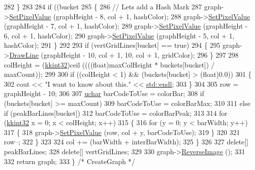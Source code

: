 \begin{DoxyCode}
282     \}
283 
284     \textcolor{keywordflow}{if}  ((bucket %
285     \{
286       \textcolor{comment}{// Lets add a Hash Mark}
287       graph->\hyperlink{class_k_k_b_1_1_raster_a5ddb8bd069dc64241941b0b011af8667}{SetPixelValue} (graphHeight - 8, col + 1, hashColor);
288       graph->\hyperlink{class_k_k_b_1_1_raster_a5ddb8bd069dc64241941b0b011af8667}{SetPixelValue} (graphHeight - 7, col + 1, hashColor);
289       graph->\hyperlink{class_k_k_b_1_1_raster_a5ddb8bd069dc64241941b0b011af8667}{SetPixelValue} (graphHeight - 6, col + 1, hashColor);
290       graph->\hyperlink{class_k_k_b_1_1_raster_a5ddb8bd069dc64241941b0b011af8667}{SetPixelValue} (graphHeight - 5, col + 1, hashColor);
291     \}
292 
293     \textcolor{keywordflow}{if}  (vertGridLines[bucket] == \textcolor{keyword}{true})
294     \{
295       graph->\hyperlink{class_k_k_b_1_1_raster_a118bf0fa32356ddea42f579c044c65cd}{DrawLine} (graphHeight - 10, col + 1, 10, col + 1, gridColor);
296     \}
297 
298     colHeight = (\hyperlink{namespace_k_k_b_a8fa4952cc84fda1de4bec1fbdd8d5b1b}{kkint32})ceil ((((\textcolor{keywordtype}{float})maxColHeight * buckets[bucket]) / maxCount));
299 
300     \textcolor{keywordflow}{if}  ((colHeight < 1)  &&  (buckets[bucket] > (float)0.0))
301     \{
302       cout << \textcolor{stringliteral}{"I want to know about this."} << \hyperlink{namespace_k_k_b_ad1f50f65af6adc8fa9e6f62d007818a8}{std::endl};
303     \}
304 
305     row = graphHeight - 10;
306 
307     \hyperlink{namespace_k_k_b_ace9969169bf514f9ee6185186949cdf7}{uchar}  barCodeToUse = colorBar;
308     \textcolor{keywordflow}{if}  (buckets[bucket] >= maxCount)
309       barCodeToUse = colorBarMax;
310 
311     \textcolor{keywordflow}{else} \textcolor{keywordflow}{if}  (peakBarLines[bucket])
312       barCodeToUse = colorBarPeak;
313 
314     \textcolor{keywordflow}{for}  (\hyperlink{namespace_k_k_b_a8fa4952cc84fda1de4bec1fbdd8d5b1b}{kkint32}  x = 0;  x < colHeight;  x++)
315     \{
316       \textcolor{keywordflow}{for}  (y = 0;  y < barWidth;  y++)
317       \{
318         graph->\hyperlink{class_k_k_b_1_1_raster_a5ddb8bd069dc64241941b0b011af8667}{SetPixelValue} (row, col + y, barCodeToUse);
319       \}
320 
321       row--;
322     \}
323 
324     col += (barWidth + interBarWidth);
325   \}  
326 
327   \textcolor{keyword}{delete}[]  peakBarLines;
328   \textcolor{keyword}{delete}[]  vertGridLines;
329 
330   graph->\hyperlink{class_k_k_b_1_1_raster_a6bd18a014fd3867714e04c037f021497}{ReverseImage} ();
331 
332   \textcolor{keywordflow}{return}  graph;
333 \}  \textcolor{comment}{/* CreateGraph */}
\end{DoxyCode}
